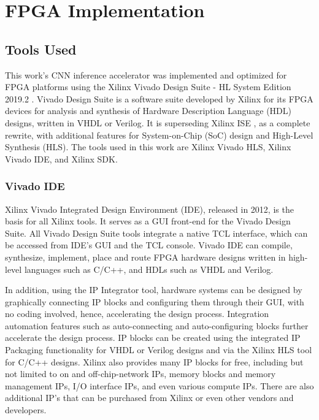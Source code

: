 \chapter{FPGA Implementation}
\label{Chapter-FPGA-Implementation}

\section{Tools Used}
This work's CNN inference accelerator was implemented and optimized for FPGA platforms using the Xilinx Vivado Design Suite - HL System Edition 2019.2 \cite{Vivado-Design-Suite}. Vivado Design Suite is a software suite developed by Xilinx for its FPGA devices for analysis and synthesis of Hardware Description Language (HDL) designs, written in VHDL or Verilog. It is superseding Xilinx ISE \cite{Xilinx-ISE}, as a complete rewrite, with additional features for System-on-Chip (SoC) design and High-Level Synthesis (HLS). The tools used in this work are Xilinx Vivado HLS, Xilinx Vivado IDE, and Xilinx SDK.

\subsection{Vivado IDE}
Xilinx Vivado Integrated Design Environment (IDE), released in 2012, is the basis for all Xilinx tools. It serves as a GUI front-end for the Vivado Design Suite. All Vivado Design Suite tools integrate a native TCL interface, which can be accessed from IDE's GUI and the TCL console. Vivado IDE can compile, synthesize, implement, place and route FPGA hardware designs written in high-level languages such as C/C++, and HDLs such as VHDL and Verilog.

In addition, using the IP Integrator tool, hardware systems can be designed by graphically connecting IP blocks and configuring them through their GUI, with no coding involved, hence, accelerating the design process. Integration automation features such as auto-connecting and auto-configuring blocks further accelerate the design process. IP blocks can be created using the integrated IP Packaging functionality for VHDL or Verilog designs and via the Xilinx HLS tool for C/C++ designs. Xilinx also provides many IP blocks for free, including but not limited to on and off-chip-network IPs, memory blocks and memory management IPs, I/O interface IPs, and even various compute IPs. There are also additional IP's that can be purchased from Xilinx or even other vendors and developers.


